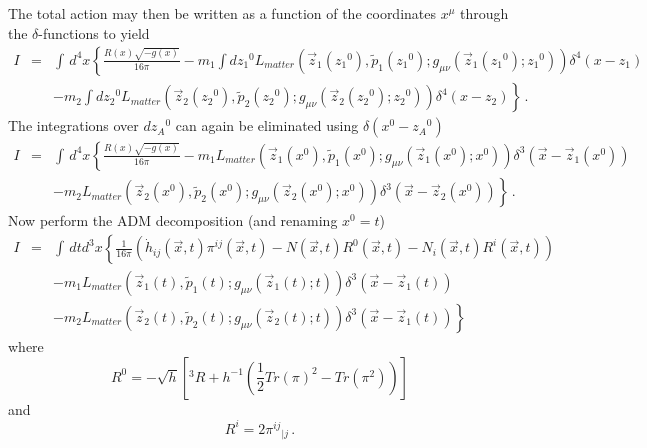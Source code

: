 The total action may then be written as a function of 
the coordinates $x^{\mu}$ through the $\delta$-functions 
to yield 
\begin{eqnarray*}
  I & = & \int \, d^4 x \left\{
  	  	   	  	  		  \frac{R(x) \sqrt{-g(x)}}{16 \pi} 
						  -m_1 \int d{z_1}^0 
						  L_{matter}(\vec z_1({z_1}^0),
						             \tilde p_1({z_1}^0);
									 g_{\mu\nu}(\vec z_1({z_1}^0);{z_1}^0))
						  \delta^4(x - z_1) \right. \\
	&    &                \left.		
						  -m_2 \int d{z_2}^0 
						  L_{matter}(\vec z_2({z_2}^0),
						             \tilde p_2({z_2}^0);
									 g_{\mu\nu}(\vec z_2({z_2}^0);{z_2}^0))
						  \delta^4(x - z_2)
  	  	   	  	  	\right\} \, .
\end{eqnarray*}
The integrations over $d {z_A}^0$ can again be eliminated using $\delta(x^0 - {z_A}^0)$
\begin{eqnarray*}
  I & = & \int \, d^4 x \left\{
  	  	   	  	  		  \frac{R(x) \sqrt{-g(x)}}{16 \pi} 
						  -m_1  
						  L_{matter}(\vec z_1(x^0),
						             \tilde p_1(x^0);
									 g_{\mu\nu}(\vec z_1(x^0);x^0))
						  \delta^3(\vec x - \vec z_1(x^0)) \right. \\
	&    &                \left.
						  -m_2  
						  L_{matter}(\vec z_2(x^0),
						             \tilde p_2(x^0);
									 g_{\mu\nu}(\vec z_2(x^0);x^0))
						  \delta^3(\vec x - \vec z_2(x^0))
  	  	   	  	  	\right\} \, .
\end{eqnarray*}
Now perform the ADM decomposition (and renaming $x^0 = t$)
\begin{eqnarray*}
  I & = &  \int \, dt d^3 x \left\{
                             \frac{1}{16 \pi}
                             \left( {\dot h}_{ij}(\vec x, t) \pi^{ij}(\vec x, t) - 
							        N(\vec x, t) R^0(\vec x, t) - N_i(\vec x, t) R^i(\vec x, t) 
							 \right) \right. \\
    &   &        						
	             -m_1 
     			  L_{matter}(\vec z_1(t),
				             \tilde p_1(t);
							 g_{\mu\nu}(\vec z_1(t);t))
		    				  \delta^3(\vec x - \vec z_1(t)) \\
    &   &         \left.
				 -m_2
     			  L_{matter}(\vec z_2(t),
				             \tilde p_2(t);
							 g_{\mu\nu}(\vec z_2(t);t))
		    				  \delta^3(\vec x - \vec z_1(t))
  	  	   	  	  	\right\} 
\end{eqnarray*}
where 
\[
  R^0 = -\sqrt{h}\left[ {}^3R + 
         h^{-1} \left( \frac{1}{2}Tr(\pi)^2 - Tr(\pi^2)\right) \right]
\]
and
\[
  R^i = 2 {\pi^{ij}}_{|j} \, .
\]
